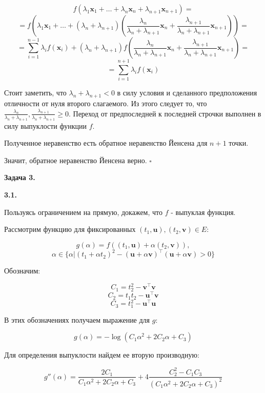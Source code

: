 \documentclass[12pt]{article}
\begin{document}
$$f\left(\lambda_1 \textbf{x}_1 +\dots+\lambda_n \textbf{x}_n + \lambda_{n+1}\textbf{x}_{n+1}\right) = $$
$$=f\left(\lambda_1 \textbf{x}_1 +\dots+(\lambda_n + \lambda_{n+1})\left(\frac{\lambda_n}{\lambda_n + \lambda_{n+1}} \textbf{x}_n + \frac{\lambda_{n+1}}{\lambda_n + \lambda_{n+1}}\textbf{x}_{n+1}\right)\right)=$$
$$=\sum\limits_{i=1}^{n-1}\lambda_i f(\textbf{x}_i) + \left(\lambda_n + \lambda_{n+1}\right)f\left(\frac{\lambda_n}{\lambda_n + \lambda_{n+1}} \textbf{x}_n + \frac{\lambda_{n+1}}{\lambda_n + \lambda_{n+1}}\textbf{x}_{n+1}\right) = $$
$$=\sum\limits_{i=1}^{n+1}\lambda_i f(\textbf{x}_i)$$

Стоит заметить, что $\lambda_n + \lambda_{n+1} < 0$ в силу условия и сделанного предположения отличности от нуля второго слагаемого. Из этого следует то, что $ \frac{\lambda_{n}}{\lambda_n + \lambda_{n+1}},  \frac{\lambda_{n+1}}{\lambda_n + \lambda_{n+1}} \geq 0$. Переход от предпоследней к последней строчки выполнен в силу выпуклости функции $f$. 

Полученное неравенство есть обратное неравенство Йенсена для $n+1$ точки.

Значит, обратное неравенство Йенсена верно. $\square$
\begin{center}
	\textbf{Задача 3.}
\end{center}

\begin{center}
	\textbf{3.1.}
\end{center}

Пользуясь ограничением на прямую, докажем, что $f$ - выпуклая функция.

Рассмотрим функцию для фиксированных $(t_1, \textbf{u}), (t_2, \textbf{v}) \in E$:

$$g(\alpha) = f((t_1, \textbf{u}) + \alpha (t_2, \textbf{v})),$$
$$\alpha \in\{\alpha|(t_1+\alpha t_2)^2 - (\textbf{u}+\alpha \textbf{v})^{\top}(\textbf{u}+\alpha \textbf{v})>0\}$$

Обозначим:

$$C_1 = t_2^2 - \textbf{v}^{\top}\textbf{v}$$
$$C_2 = t_1t_2 - \textbf{u}^{\top}\textbf{v}$$
$$C_3 = t_1^2 - \textbf{u}^{\top}\textbf{u}$$

В этих обозначениях получаем выражение для $g$:

$$g(\alpha) = -\log(C_1\alpha^2 + 2C_2\alpha + C_3)$$

Для определения выпуклости найдем ее вторую производную:

$$g''(\alpha) = \frac{2C_1}{C_1\alpha^2 + 2C_2\alpha + C_3}+4\frac{C_2^2-C_1C_3}{(C_1\alpha^2 + 2C_2\alpha + C_3)^2}$$
\end{document}
